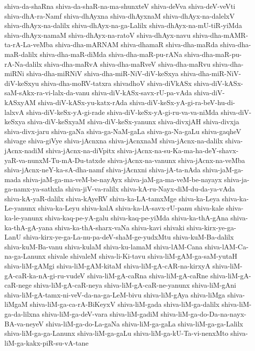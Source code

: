{shiva-da-shaRna
shiva-da-shaR-na-ma-shunxteV
shiva-deVva
shiva-deV-veVti
shiva-dhA-ra-Namf
shiva-dhAyxna
shiva-dhAyxnaM
shiva-dhAyx-na-dalelxV
shiva-dhAyx-na-dalilx
shiva-dhAyx-na-ga-Lalilx
shiva-dhAyx-na-mU-tiR-yiMda
shiva-dhAyx-namaM
shiva-dhAyx-na-ratoV
shiva-dhAyx-navu
shiva-dha-mAMR-ta-rA-La-veMba
shiva-dha-mARNAM
shiva-dhamaR
shiva-dha-maRda
shiva-dha-maR-dalilx
shiva-dha-maR-diMda
shiva-dha-maR-pu-rANa
shiva-dha-maR-pu-rA-Na-dalilx
shiva-dha-maRvA
shiva-dha-maRveV
shiva-dha-maRvu
shiva-dha-miRNi
shiva-dha-miRNiV
shiva-dha-miR-NiV-diV-keSxya
shiva-dha-miR-NiV-diV-keSxyu
shiva-dha-moRV-tatxra
shivadhoV
shiva-diVkASx
shiva-diV-kASx-saM-sAkx-ra-vi-lalx-da-vanu
shiva-diV-kASx-savx-rU-pa-vAda
shiva-diV-kASxyAM
shiva-diV-kASx-yu-katx-rAda
shiva-diV-keSx-yA-gi-ra-beV-hu-di-lalxvA
shiva-diV-keSx-yA-gi-rade
shiva-diV-keSx-yA-gi-ru-va-va-niMda
shiva-diV-keSxya
shiva-diV-keSxyaM
shiva-diV-keSx-yanunx
shiva-divxjAH
shiva-divxja
shiva-divx-jaru
shiva-gaNa
shiva-ga-NaM-gaLa
shiva-ga-Na-gaLu
shiva-gaqheV
shivage
shiva-giVye
shiva-jAcnxna
shiva-jAcnxnaM
shiva-jAcnx-na-dalilx
shiva-jAcnx-nadiM
shiva-jAcnx-na-diVpitx
shiva-jAcnx-na-su-Ka-ma-ha-deY-shavx-yaR-va-nunxM-Tu-mA-Du-tatxde
shiva-jAcnx-na-vanunx
shiva-jAcnx-na-veMba
shiva-jAcnx-neY-ka-sA-dha-namf
shiva-jAcnxni
shiva-jA-ta-nAda
shiva-jaM-ga-mada
shiva-jaM-ga-ma-veM-be-nayAyx
shiva-jaM-ga-ma-veM-be-nayayx
shiva-ja-ga-namx-ya-sathxla
shiva-jiV-va-ralilx
shiva-kA-ru-Nayx-diM-du-da-ya-vAda
shiva-kA-yaR-dalilx
shiva-kAyeRV
shiva-ka-LA-tamxMge
shiva-ka-Leya
shiva-ka-Le-yanunx
shiva-ka-Leyu
shiva-kalA
shiva-ka-lA-savx-rU-panu
shiva-kale
shiva-ka-le-yanunx
shiva-kaq-pe-yA-galu
shiva-kaq-pe-yiMda
shiva-ka-thA-gAna
shiva-ka-thA-gA-yana
shiva-ka-thA-sharx-vaNa
shiva-kavi
shivaki
shiva-kirx-ye-ga-LanU
shiva-kirx-ye-ga-La-nu-pa-deV-shaM-ge-yudxMtu
shiva-kuM-Ba-dalilx
shiva-kuM-Ba-vanu
shiva-kulaM
shiva-ku-lamaM
shiva-lAM-Cana
shiva-lAM-Ca-na-ga-Lanunx
shivale
shivaleM
shiva-li-Ki-tavu
shiva-liM-gAM-ga-saM-yutaH
shiva-liM-gAMgi
shiva-liM-gAM-kitaM
shiva-liM-gA-cAR-na-kirxyA
shiva-liM-gA-caR-ka-nA-gi-ru-vudeV
shiva-liM-gA-caRna
shiva-liM-gA-caRne
shiva-liM-gA-caR-nege
shiva-liM-gA-caR-neya
shiva-liM-gA-caR-ne-yanunx
shiva-liM-gAni
shiva-liM-gA-tamx-ni-veV-da-na-ga-LeM-bivu
shiva-liM-gAya
shiva-liMga
shiva-liMgaM
shiva-liM-ga-ca-rA-BiKeyxV
shiva-liM-gada
shiva-liM-ga-dalilx
shiva-liM-ga-da-lilxna
shiva-liM-ga-deV-vara
shiva-liM-gadiM
shiva-liM-ga-do-Da-na-nayx-BA-va-neyeV
shiva-liM-ga-do-La-gaNa
shiva-liM-ga-gaLa
shiva-liM-ga-ga-Lalilx
shiva-liM-ga-ga-Lanunx
shiva-liM-ga-gaLu
shiva-liM-ga-kU-Ta-vi-nenxMto
shiva-liM-ga-kakx-piR-su-vA-tane
}

